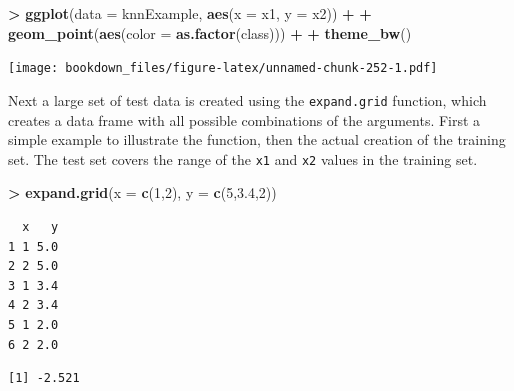 \documentclass[]{krantz}
\makeatletter
\newenvironment{Shaded}{\begin{snugshade}}{\end{snugshade}}
\newcommand{\KeywordTok}[1]{\textcolor[rgb]{0.27,0.27,0.27}{\textbf{#1}}}
\newcommand{\DataTypeTok}[1]{\textcolor[rgb]{0.27,0.27,0.27}{#1}}
\newcommand{\DecValTok}[1]{\textcolor[rgb]{0.06,0.06,0.06}{#1}}
\newcommand{\FloatTok}[1]{\textcolor[rgb]{0.06,0.06,0.06}{#1}}
\newcommand{\StringTok}[1]{\textcolor[rgb]{0.5,0.5,0.5}{#1}}
\newcommand{\OperatorTok}[1]{\textcolor[rgb]{0.43,0.43,0.43}{\textbf{#1}}}
\newcommand{\NormalTok}[1]{#1}
\newenvironment{kframe}{%
\medskip{}
\setlength{\fboxsep}{.8em}
 \def\at@end@of@kframe{}%
 \ifinner\ifhmode%
  \def\at@end@of@kframe{\end{minipage}}%
  \begin{minipage}{\columnwidth}%
 \fi\fi%
 \def\FrameCommand##1{\hskip\@totalleftmargin \hskip-\fboxsep
 \colorbox{shadecolor}{##1}\hskip-\fboxsep
     \hskip-\linewidth \hskip-\@totalleftmargin \hskip\columnwidth}%
 \MakeFramed {\advance\hsize-\width
   \@totalleftmargin\z@ \linewidth\hsize
   \@setminipage}}%
 {\par\unskip\endMakeFramed%
 \at@end@of@kframe}
\renewenvironment{Shaded}{\begin{kframe}}{\end{kframe}}
\makeatother
\begin{document}
\begin{Shaded}
\begin{Highlighting}[]
\OperatorTok{>}\StringTok{ }\KeywordTok{ggplot}\NormalTok{(}\DataTypeTok{data =}\NormalTok{ knnExample, }\KeywordTok{aes}\NormalTok{(}\DataTypeTok{x =}\NormalTok{ x1, }\DataTypeTok{y =}\NormalTok{ x2)) }\OperatorTok{+}\StringTok{ }
\OperatorTok{+}\StringTok{    }\KeywordTok{geom_point}\NormalTok{(}\KeywordTok{aes}\NormalTok{(}\DataTypeTok{color =} \KeywordTok{as.factor}\NormalTok{(class))) }\OperatorTok{+}
\OperatorTok{+}\StringTok{    }\KeywordTok{theme_bw}\NormalTok{()}
\end{Highlighting}
\end{Shaded}

\texttt{[image: bookdown\_files/figure-latex/unnamed-chunk-252-1.pdf]}

Next a large set of test data is created using the \texttt{expand.grid}
function, which creates a data frame with all possible combinations of
the arguments. First a simple example to illustrate the function, then
the actual creation of the training set. The test set covers the range
of the \texttt{x1} and \texttt{x2} values in the training set.

\begin{Shaded}
\begin{Highlighting}[]
\OperatorTok{>}\StringTok{ }\KeywordTok{expand.grid}\NormalTok{(}\DataTypeTok{x =} \KeywordTok{c}\NormalTok{(}\DecValTok{1}\NormalTok{,}\DecValTok{2}\NormalTok{), }\DataTypeTok{y =} \KeywordTok{c}\NormalTok{(}\DecValTok{5}\NormalTok{,}\FloatTok{3.4}\NormalTok{,}\DecValTok{2}\NormalTok{))}
\end{Highlighting}
\end{Shaded}

\begin{verbatim}
  x   y
1 1 5.0
2 2 5.0
3 1 3.4
4 2 3.4
5 1 2.0
6 2 2.0
\end{verbatim}

\begin{Shaded}
\end{Shaded}

\begin{verbatim}
[1] -2.521
\end{verbatim}

\begin{Shaded}
\end{Shaded}
\end{document}
